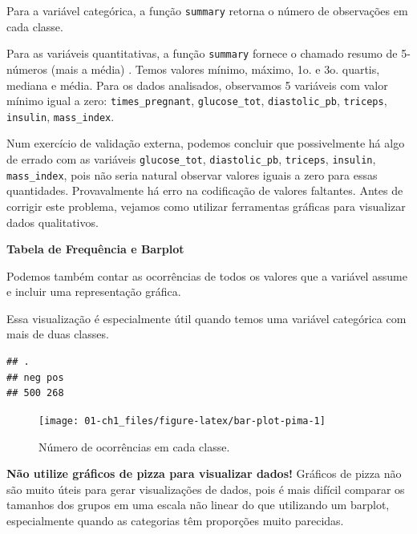 \documentclass[
]{book}
\newenvironment{Shaded}{\begin{snugshade}}{\end{snugshade}}
\newcommand{\CommentTok}[1]{\textcolor[rgb]{0.56,0.35,0.01}{\textit{#1}}}
\newcommand{\KeywordTok}[1]{\textcolor[rgb]{0.13,0.29,0.53}{\textbf{#1}}}
\newcommand{\NormalTok}[1]{#1}
\newcommand{\OperatorTok}[1]{\textcolor[rgb]{0.81,0.36,0.00}{\textbf{#1}}}
\newcommand{\StringTok}[1]{\textcolor[rgb]{0.31,0.60,0.02}{#1}}
\theoremstyle{definition}
\theoremstyle{definition}
\theoremstyle{definition}
\theoremstyle{remark}
\begin{document}
Para a variável categórica, a função \texttt{summary} retorna o número de observações em cada classe.

Para as variáveis quantitativas, a função \texttt{summary} fornece o chamado resumo de 5-números (mais a média) . Temos valores mínimo, máximo, 1o. e 3o. quartis, mediana e média. Para os dados analisados, observamos 5 variáveis com valor mínimo igual a zero: \texttt{times\_pregnant}, \texttt{glucose\_tot}, \texttt{diastolic\_pb}, \texttt{triceps}, \texttt{insulin}, \texttt{mass\_index}.

Num exercício de validação externa, podemos concluir que possivelmente há algo de errado com as variáveis \texttt{glucose\_tot}, \texttt{diastolic\_pb}, \texttt{triceps}, \texttt{insulin}, \texttt{mass\_index}, pois não seria natural observar valores iguais a zero para essas quantidades. Provavalmente há erro na codificação de valores faltantes. Antes de corrigir este problema, vejamos como utilizar ferramentas gráficas para visualizar dados qualitativos.

\textbf{Tabela de Frequência e Barplot}

Podemos também contar as ocorrências de todos os valores que a variável assume e incluir uma representação gráfica.

Essa visualização é especialmente útil quando temos uma variável categórica com mais de duas classes.

\begin{Shaded}
\end{Shaded}

\begin{verbatim}
## .
## neg pos 
## 500 268
\end{verbatim}

\begin{figure}
\texttt{[image: 01-ch1\_files/figure-latex/bar-plot-pima-1]} \caption{Número de ocorrências em cada classe.}\label{fig:bar-plot-pima}
\end{figure}

\textbf{Não utilize gráficos de pizza para visualizar dados!} Gráficos de pizza não são muito úteis para gerar visualizações de dados, pois é mais difícil comparar os tamanhos dos grupos em uma escala não linear do que utilizando um barplot, especialmente quando as categorias têm proporções muito parecidas.
\end{document}
